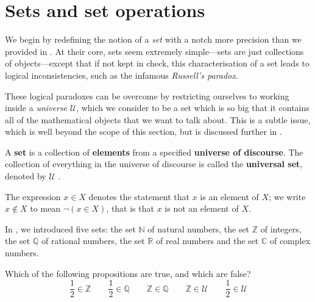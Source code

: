 \section{Sets and set operations}

We begin by redefining the notion of a \textit{set} with a notch more precision than we provided in . At their core, sets seem extremely simple---sets are just collections of objects---except that if not kept in check, this characterisation of a set leads to logical inconsistencies, such as the infamous \textit{Russell's paradox}.

These logical paradoxes can be overcome by restricting ourselves to working inside a \textit{universe} $\mathcal{U}$, which we consider to be a set which is so big that it contains all of the mathematical objects that we want to talk about. This is a subtle issue, which is well beyond the scope of this section, but is discussed further in .

\begin{definition}
\label{defSet}
A \textbf{set} is a collection of \textbf{elements} from a specified \textbf{universe of discourse}. The collection of everything in the universe of discourse is called the \textbf{universal set}, denoted by $\mathcal{U}$ .

The expression $x \in X$  denotes the statement that $x$ is an element of $X$; we write $x \not \in X$  to mean $\neg (x \in X)$, that is that $x$ is not an element of $X$.
\end{definition}

\begin{example}
In , we introduced five sets: the set $\mathbb{N}$ of natural numbers, the set $\mathbb{Z}$ of integers, the set $\mathbb{Q}$ of rational numbers, the set $\mathbb{R}$ of real numbers and the set $\mathbb{C}$ of complex numbers.
\end{example}

\begin{exercise}
Which of the following propositions are true, and which are false?
\[ \frac{1}{2} \in \mathbb{Z} \qquad \frac{1}{2} \in \mathbb{Q} \qquad \mathbb{Z} \in \mathbb{Q} \qquad \mathbb{Z} \in \mathcal{U} \qquad \frac{1}{2} \in \mathcal{U} \]
\end{exercise}


